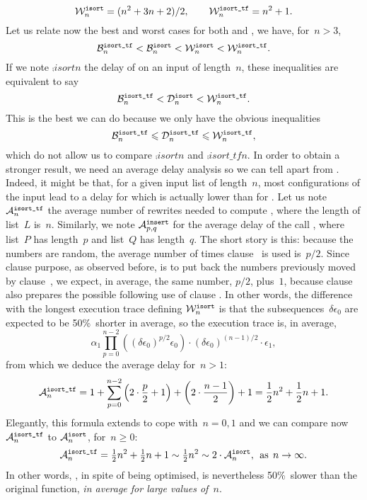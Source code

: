 \[
\worst{isort}{n}     = (n^2 + 3n + 2)/2,\qquad
\worst{isort\_tf}{n} = n^2 + 1.
\]
Let us relate now the best and worst cases for both 
and , we have, for~\(n>3\),
\[
\best{isort\_tf}{n} < \best{isort}{n} < \worst{isort}{n} <
\worst{isort\_tf}{n}.
\]
If we note \(\comp{isort}{n}\) the delay of  on an
input of length~\(n\), these inequalities are equivalent to say
\[
\best{isort\_tf}{n} < \comp{isort}{n} < \worst{isort\_tf}{n}.
\]
This is the best we can do because we only have the obvious
inequalities
\[
\best{isort\_tf}{n} \leqslant \comp{isort\_tf}{n} 
\leqslant \worst{isort\_tf}{n},
\]
which do not allow us to compare \(\comp{isort}{n}\) and
\(\comp{isort\_tf}{n}\). In order to obtain a stronger result, we need
an average delay analysis so we can tell apart 
from . Indeed, it might be that, for a given input
list of length~\(n\), most configurations of the input lead to a delay
for  which is actually lower than for
. Let us note \(\ave{isort\_tf}{n}\) the average
number of rewrites needed to compute ,
where the length of list~\(L\) is~\(n\). Similarly, we note
\(\ave{insert}{p,q}\) for the average delay of the call
, where list~\(P\) has length~\(p\)
and list~\(Q\) has length~\(q\). The short story is this: because the
numbers are random, the average number of times clause~\clause{\delta}
is used is~\(p/2\). Since clause  purpose, as
observed before, is to put back the numbers previously moved by
clause~\clause{\delta}, we expect, in average, the same number,
\(p/2\), plus~\(1\), because clause~ also prepares
the possible following use of clause \clause{\delta}. In other words,
the difference with the longest execution trace defining
\(\worst{isort}{n}\) is that the subsequences~\(\delta\epsilon_0\) are
expected to be 50\%~shorter in average, so the execution trace is, in
average,
\[
\alpha_1\prod_{p=0}^{n-2}{\left((\delta\epsilon_0)^{p/2}\epsilon_0\right)}
\cdot (\delta\epsilon_0)^{(n-1)/2} \cdot \epsilon_1,
\]
from which we deduce the average delay for~\(n>1\):
\[
\ave{isort\_tf}{n} = 1 + \sum_{p=0}^{n-2}{\left(2\cdot\frac{p}{2}+1\right)} 
                       + \left(2\cdot\frac{n-1}{2}\right) + 1
                     = \frac{1}{2}{n^2} + \frac{1}{2}{n} + 1.
\]
Elegantly, this formula extends to cope with~\(n=0,1\) and we can
compare now \(\ave{isort\_tf}{n}\) to \(\ave{isort}{n}\),
for~\(n\geqslant{}0\):
\[
\ave{isort\_tf}{n}
  = \tfrac{1}{2}{n^2} + \tfrac{1}{2}{n} + 1
  \mathrel{\sim} \tfrac{1}{2}{n^2} \mathrel{\sim} 2 \cdot
\ave{isort}{n}, \,\; \text{as} \,\; n \rightarrow \infty.
\]
In other words, , in spite of being optimised, is
nevertheless 50\%~slower than the original function, \emph{in average
  for large values of~\(n\)}.

